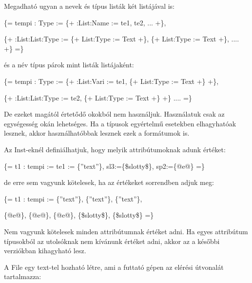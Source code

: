 Megadható ugyan a nevek és típus listák két listájával is:

\{= tempi : Type := \{+ :List:Name := te1, te2, ... +\}, 

\{+ :List:List:Type := \{+ List:Type := Text +\}, \{+ List:Type := Text +\}, .... +\} =\}

és a név típus párok mint listák listájaként:

\{= tempi : Type := \{+ :List:Vari := te1, \{+ List:Type := Text +\} +\}, 

\{+ :List:List:Type := te2, \{+ List:Type := Text +\} +\} .... =\}

De ezeket magától értetődő okokból nem használjuk.
Használatuk csak az egységesség okán lehetséges.
Ha a típusok egyértelmű esetekben elhagyhatóak lesznek, akkor használhatóbbak lesznek ezek a formátumok is.

Az Inst-eknél definiálhatjuk, hogy melyik attribútumoknak adunk értéket:

\{= t1 : tempi := te1 := \{”text”\}, sl3:=\{\$slotty\$\}, sp2:=\{@e@\} =\}

de erre sem vagyunk kötelesek, ha az értékeket sorrendben adjuk meg:

\{= t1 : tempi := \{”text”\}, \{”text”\}, \{”text”\}, 

\{@e@\}, \{@e@\}, \{@e@\}, \{\$slotty\$\}, \{\$slotty\$\} =\}

Nem vagyunk kötelesek minden attribútumnak értéket adni.
Ha egyes attribútum típusokból az utolsóknak nem kívánunk értéket adni, akkor az a későbbi verziókban kihagyható lesz.

A File egy text-tel hozható létre, ami a futtató gépen az elérési útvonalát tartalmazza:

